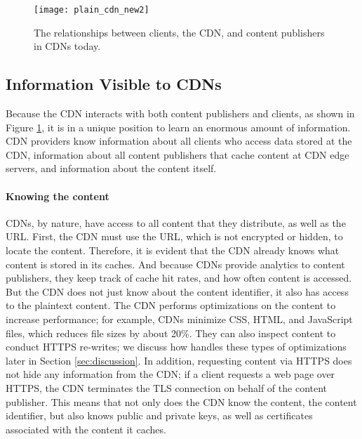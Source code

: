 \begin{figure}[t]
\centering
\texttt{[image: plain\_cdn\_new2]}
\caption{The relationships between clients, the CDN, and content publishers in 
CDNs today.}
\label{fig:basic_cdn}
\end{figure}

\subsection{Information Visible to CDNs}
\label{sec:info}
Because the CDN interacts with both content publishers and clients, as shown in Figure \ref{fig:basic_cdn}, it is in a unique position 
to learn an enormous amount of information.  CDN providers know information about all clients who
access data stored at the CDN, information about all content publishers that cache content at 
CDN edge servers, and information about the content itself.

\paragraph{Knowing the content}  CDNs, by nature, have access to all content that they distribute, as well as 
the URL.  First, the CDN must use the URL, which is not 
encrypted or hidden, to locate the content. Therefore, it is evident that the CDN already knows what content is 
stored in its caches.  And because CDNs provide analytics to content publishers, they keep track of cache hit 
rates, and how often content is accessed.  But the CDN does not just know about the content identifier, it also 
has access to the plaintext content.  The CDN performs optimizations on the content to increase performance; 
for example, CDNs minimize CSS, HTML, and JavaScript files, which reduces file sizes by about 20\%.  They can 
also inspect content to conduct HTTPS re-writes; we discuss how \system{} handles these types of optimizations later 
in Section \ref{sec:discussion}. In addition, requesting content via HTTPS does not hide any information 
from the CDN; if a client requests a web page over HTTPS, the CDN terminates the TLS connection on behalf of the 
content publisher.  This means that not only does the CDN know the content, the content identifier, but also knows 
public and private keys, as well as certificates associated with the content it caches.  

